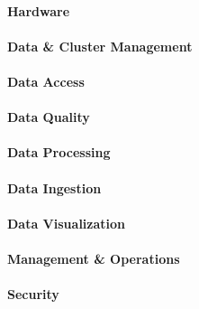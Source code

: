\paragraph{Hardware}

\paragraph{Data \& Cluster Management}

\paragraph{Data Access}

\paragraph{Data Quality}

\paragraph{Data Processing}

\paragraph{Data Ingestion}

\paragraph{Data Visualization}

\paragraph{Management \& Operations}

\paragraph{Security}
